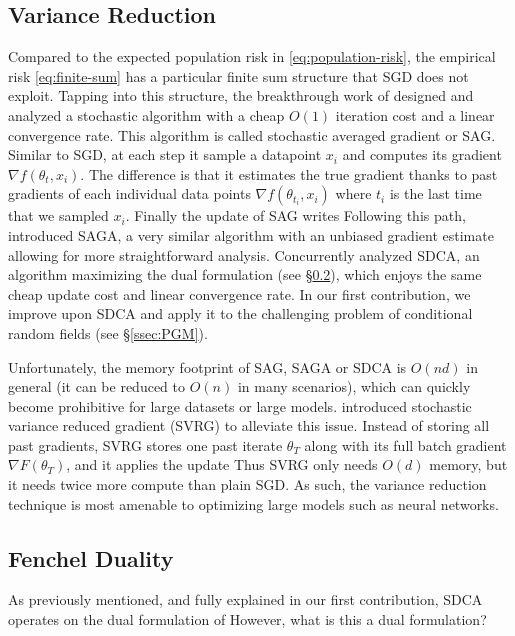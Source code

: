 \subsection{Variance Reduction}
\label{ssec:variance-reduction}
Compared to the expected population risk in \cref{eq:population-risk}, the empirical risk \cref{eq:finite-sum} has a particular finite sum structure that SGD does not exploit.
Tapping into this structure, the breakthrough work of \citet{roux2012stochastic} designed and analyzed a stochastic algorithm with a  cheap $O(1)$ iteration cost and a linear convergence rate. 
This algorithm is called stochastic averaged gradient or SAG. 
Similar to SGD, at each step it sample a datapoint $x_i$ and computes its gradient $\nabla f(\theta_{t}, x_i)$.
The difference is that it estimates the true gradient thanks to past gradients of each individual data points $\nabla f(\theta_{t_i}, x_i)$ where $t_i$ is the last time that we sampled $x_i$.
Finally the update of SAG writes
Following this path, \citet{defazio2014saga} introduced SAGA, a very similar algorithm with an unbiased gradient estimate allowing for more straightforward analysis.
Concurrently \citet{shalev-shwartz_stochastic_2013} analyzed SDCA, an algorithm maximizing the dual formulation (see \S\ref{ssec:fenchel-duality}), which enjoys the same cheap update cost and linear convergence rate.
In our first contribution, we improve upon SDCA and apply it to the challenging problem of conditional random fields (see \S\ref{ssec:PGM}).

Unfortunately, the memory footprint of SAG, SAGA or SDCA is $O(n d)$ in general (it can be reduced to $O(n)$ in many scenarios), which can quickly become prohibitive for large datasets or large models. 
\citet{johnson2013accelerating} introduced stochastic variance reduced gradient (SVRG) to alleviate this issue. 
Instead of storing all past gradients, SVRG stores one past iterate $\theta_T$ along with its full batch gradient $\nabla F(\theta_T)$, and it applies the update
Thus SVRG only needs $O(d)$ memory, but it needs twice more compute than plain SGD. As such, the variance reduction technique is most amenable to optimizing large models such as neural networks.

\subsection{Fenchel Duality}
\label{ssec:fenchel-duality}
As previously mentioned, and fully explained in our first contribution, SDCA operates on the dual formulation of 
However, what is this a dual formulation?

